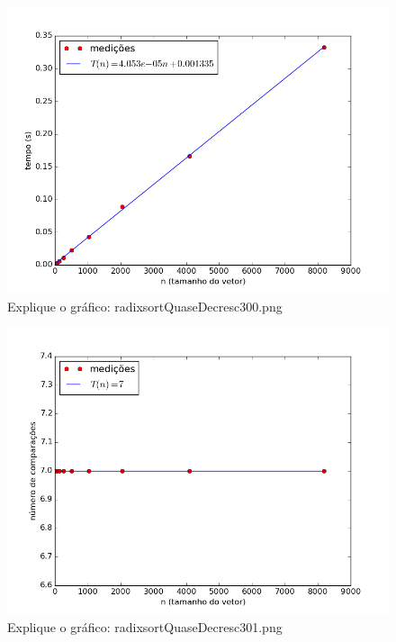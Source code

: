 \documentclass[12pt,a4paper,twoside]{report}
\begin{document}
\clearpage


\begin{figure}[ht]
\centering \includegraphics[scale=0.8]{../radixsort/imagens/radixsortQuaseDecresc300.png}
\caption{Explique o gráfico: radixsortQuaseDecresc300.png}
\label{fig:radixsortQuaseDecresc300}
\end{figure}

\begin{figure}[ht]
\centering \includegraphics[scale=0.8]{../radixsort/imagens/radixsortQuaseDecresc301.png}
\caption{Explique o gráfico: radixsortQuaseDecresc301.png}
\label{fig:radixsortQuaseDecresc301}
\end{figure}
\end{document}
